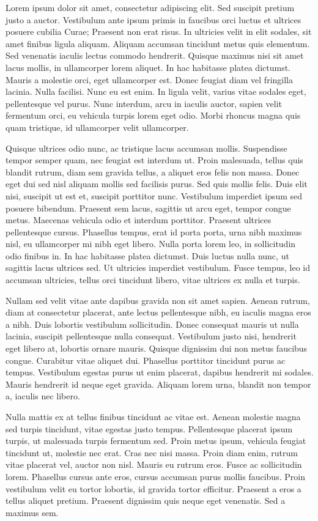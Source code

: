 Lorem ipsum dolor sit amet, consectetur adipiscing elit. Sed suscipit pretium justo a auctor. Vestibulum ante ipsum primis in faucibus orci luctus et ultrices posuere cubilia Curae; Praesent non erat risus. In ultricies velit in elit sodales, sit amet finibus ligula aliquam. Aliquam accumsan tincidunt metus quis elementum. Sed venenatis iaculis lectus commodo hendrerit. Quisque maximus nisi sit amet lacus mollis, in ullamcorper lorem aliquet. In hac habitasse platea dictumst. Mauris a molestie orci, eget ullamcorper est. Donec feugiat diam vel fringilla lacinia. Nulla facilisi. Nunc eu est enim. In ligula velit, varius vitae sodales eget, pellentesque vel purus. Nunc interdum, arcu in iaculis auctor, sapien velit fermentum orci, eu vehicula turpis lorem eget odio. Morbi rhoncus magna quis quam tristique, id ullamcorper velit ullamcorper.

Quisque ultrices odio nunc, ac tristique lacus accumsan mollis. Suspendisse tempor semper quam, nec feugiat est interdum ut. Proin malesuada, tellus quis blandit rutrum, diam sem gravida tellus, a aliquet eros felis non massa. Donec eget dui sed nisl aliquam mollis sed facilisis purus. Sed quis mollis felis. Duis elit nisi, suscipit ut est et, suscipit porttitor nunc. Vestibulum imperdiet ipsum sed posuere bibendum. Praesent sem lacus, sagittis ut arcu eget, tempor congue metus. Maecenas vehicula odio et interdum porttitor. Praesent ultrices pellentesque cursus. Phasellus tempus, erat id porta porta, urna nibh maximus nisl, eu ullamcorper mi nibh eget libero. Nulla porta lorem leo, in sollicitudin odio finibus in. In hac habitasse platea dictumst. Duis luctus nulla nunc, ut sagittis lacus ultrices sed. Ut ultricies imperdiet vestibulum. Fusce tempus, leo id accumsan ultricies, tellus orci tincidunt libero, vitae ultrices ex nulla et turpis.

Nullam sed velit vitae ante dapibus gravida non sit amet sapien. Aenean rutrum, diam at consectetur placerat, ante lectus pellentesque nibh, eu iaculis magna eros a nibh. Duis lobortis vestibulum sollicitudin. Donec consequat mauris ut nulla lacinia, suscipit pellentesque nulla consequat. Vestibulum justo nisi, hendrerit eget libero at, lobortis ornare mauris. Quisque dignissim dui non metus faucibus congue. Curabitur vitae aliquet dui. Phasellus porttitor tincidunt purus ac tempus. Vestibulum egestas purus ut enim placerat, dapibus hendrerit mi sodales. Mauris hendrerit id neque eget gravida. Aliquam lorem urna, blandit non tempor a, iaculis nec libero.

Nulla mattis ex at tellus finibus tincidunt ac vitae est. Aenean molestie magna sed turpis tincidunt, vitae egestas justo tempus. Pellentesque placerat ipsum turpis, ut malesuada turpis fermentum sed. Proin metus ipsum, vehicula feugiat tincidunt ut, molestie nec erat. Cras nec nisi massa. Proin diam enim, rutrum vitae placerat vel, auctor non nisl. Mauris eu rutrum eros. Fusce ac sollicitudin lorem. Phasellus cursus ante eros, cursus accumsan purus mollis faucibus. Proin vestibulum velit eu tortor lobortis, id gravida tortor efficitur. Praesent a eros a tellus aliquet pretium. Praesent dignissim quis neque eget venenatis. Sed a maximus sem.

